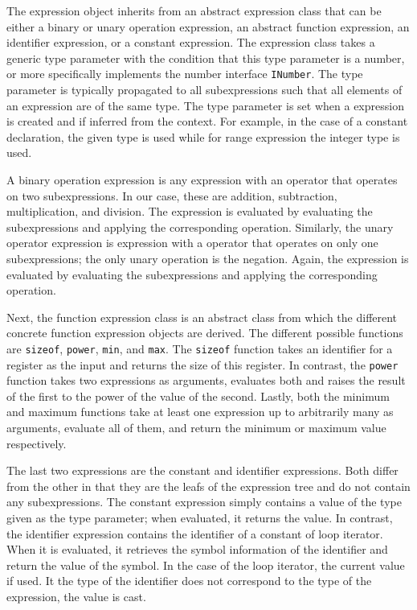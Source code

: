 The expression object inherits from an abstract expression class that can be either a binary or unary operation expression, an abstract function expression, an identifier expression, or a constant expression. The expression class takes a generic type parameter with the condition that this type parameter is a number, or more specifically implements the number interface \texttt{INumber}. The type parameter is typically propagated to all subexpressions such that all elements of an expression are of the same type. The type parameter is set when a expression is created and if inferred from the context. For example, in the case of a constant declaration, the given type is used while for range expression the integer type is used.    

A binary operation expression is any expression with an operator that operates on two subexpressions. In our case, these are addition, subtraction, multiplication, and division. The expression is evaluated by evaluating the subexpressions and applying the corresponding operation. Similarly, the unary operator expression is expression with a operator that operates on only one subexpressions; the only unary operation is the negation. Again, the expression is evaluated by evaluating the subexpressions and applying the corresponding operation. 

Next, the function expression class is an abstract class from which the different concrete function expression objects are derived. The different possible functions are \texttt{sizeof}, \texttt{power}, \texttt{min}, and \texttt{max}. The \texttt{sizeof} function takes an identifier for a register as the input and returns the size of this register. In contrast, the \texttt{power} function takes two expressions as arguments, evaluates both and raises the result of the first to the power of the value of the second. Lastly, both the minimum and maximum functions take at least one expression up to arbitrarily many as arguments, evaluate all of them, and return the minimum or maximum value respectively.

The last two expressions are the constant and identifier expressions. Both differ from the other in that they are the leafs of the expression tree and do not contain any subexpressions. The constant expression simply contains a value of the type given as the type parameter; when evaluated, it returns the value. In contrast, the identifier expression contains the identifier of a constant of loop iterator. When it is evaluated, it retrieves the symbol information of the identifier and return the value of the symbol. In the case of the loop iterator, the current value if used. It the type of the identifier does not correspond to the type of the expression, the value is cast.